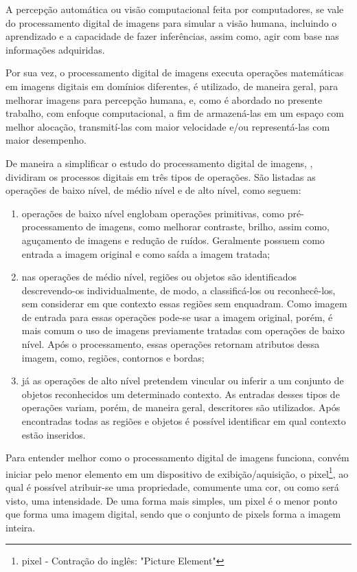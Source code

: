A percepção automática ou visão computacional feita por computadores, se vale do processamento digital de imagens para simular a visão humana, incluindo o aprendizado e a capacidade de fazer inferências, assim como, agir com base nas informações adquiridas. 

Por sua vez, o processamento digital de imagens executa operações matemáticas em imagens digitais em domínios diferentes, é utilizado, de maneira geral, para melhorar imagens para percepção humana, e, como é abordado no presente trabalho, com enfoque computacional, a fim de armazená-las em um espaço com melhor alocação, transmití-las com maior velocidade e/ou representá-las com maior desempenho. 

De maneira a simplificar o estudo do processamento digital de imagens, , dividiram os processos digitais em três tipos de operações. São listadas as operações de baixo nível, de médio nível e de alto nível, como seguem:

\begin{enumerate}
\item operações de baixo nível englobam operações primitivas, como  pré-processamento de imagens, como melhorar contraste, brilho, assim como, aguçamento de imagens e redução de ruídos. Geralmente possuem como entrada a imagem original e como saída a imagem tratada;

\item nas operações de médio nível, regiões ou objetos são identificados descrevendo-os individualmente, de modo, a classificá-los ou reconhecê-los, sem considerar em que contexto essas regiões sem enquadram. Como imagem de entrada para essas operações pode-se usar a imagem original, porém, é mais comum o uso de imagens previamente tratadas com operações de baixo nível. Após o processamento, essas operações retornam atributos dessa imagem, como, regiões, contornos e bordas;

\item já as operações de alto nível pretendem vincular ou inferir a um conjunto de objetos reconhecidos um determinado contexto. As entradas desses tipos de operações variam, porém, de maneira geral, descritores são utilizados. Após encontradas todas as regiões e objetos é possível identificar em qual contexto estão inseridos. 

\end{enumerate}

Para entender melhor como o processamento digital de imagens funciona, convém iniciar pelo menor elemento em um dispositivo de exibição/aquisição, o pixel\footnote{pixel - Contração do inglês: "Picture Element"}, ao qual é possível atribuir-se uma propriedade, comumente uma cor, ou como será visto, uma intensidade. De uma forma mais simples, um pixel é o menor ponto que forma uma imagem digital, sendo que o conjunto de pixels forma a imagem inteira.

